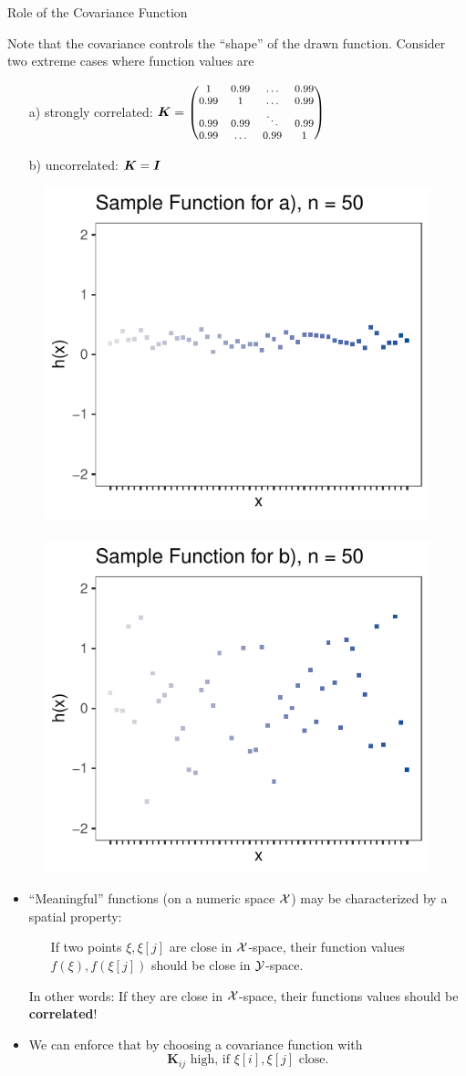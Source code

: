 \documentclass[11pt,compress,t,notes=noshow, xcolor=table]{beamer}
\begin{document}
\begin{vbframe}{Role of the Covariance Function}

Note that the covariance controls the \enquote{shape} of the drawn function. Consider two extreme cases where function values are

\begin{enumerate}
  \item[a)] strongly correlated: $\bm{K} = \begin{footnotesize}\begin{pmatrix} 1 & 0.99 & \dots & 0.99 \\
  0.99 & 1 & \dots & 0.99 \\
  0.99 & 0.99 & \ddots & 0.99 \\
  0.99 & \dots & 0.99 & 1 \end{pmatrix}\end{footnotesize}$
  \item[b)] uncorrelated: $\bm{K} = \bm{I}$
\end{enumerate}

\begin{figure}
  \includegraphics[width=0.35\linewidth]{figure/discrete/example_extreme_50_1.pdf} ~~  \includegraphics[width=0.35\linewidth]{figure/discrete/example_extreme_50_2.pdf}
\end{figure}


\framebreak 

\begin{itemize}
  \item \enquote{Meaningful} functions (on a numeric space $\mathcal{X}$) may be characterized by a spatial property: \vspace*{0.2cm}
  \begin{itemize}
    \item[] If two points $\xi, \xi[j]$ are close in $\mathcal{X}$-space, their function values $f(\xi), f(\xi[j])$ should be close in $\mathcal{Y}$-space. 
  \end{itemize} \vspace*{0.2cm}
  In other words: If they are close in $\mathcal{X}$-space, their functions values should be \textbf{correlated}! \vspace*{0.4cm}
  \item We can enforce that by choosing a covariance function with  
  $$
    \bm{K}_{ij} \text{ high, if } \xi[i], \xi[j] \text{ close.}
  $$


\end{itemize}
\end{vbframe}
\end{document}
